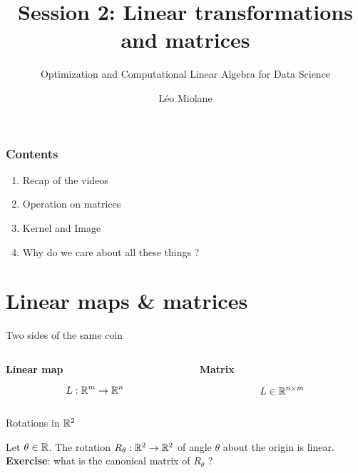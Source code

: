 \documentclass{beamer}
\title{Session 2: Linear transformations and matrices}
\subtitle{Optimization and Computational Linear Algebra for Data Science}
\author{Léo Miolane}
\date{}
\begin{document}
\setcounter{showProgressBar}{0}
\setcounter{showSlideNumbers}{0}

\frame{\titlepage}

\begin{frame}
	\frametitle{Contents}
	\begin{enumerate}
		\item Recap of the videos
		\item Operation on matrices
		\item Kernel and Image
		\item Why do we care about all these things ? 
	\end{enumerate}
\end{frame}


\setcounter{framenumber}{0}
\setcounter{showSlideNumbers}{1}

\section{Linear maps \& matrices}

\begin{frame}[t]{Two sides of the same coin}
	\grid
	\begin{columns}
		\hspace{-0.85cm}
		\begin{column}{0.5\textwidth}
			\vspace{-0.5cm}
			\begin{center}
				\bf Linear map
			\end{center}
			$$
			L: \mathbb{R}^m \to \mathbb{R}^n
			$$
			\vspace{6cm}
		\end{column}
		\vrule
		\begin{column}{0.5\textwidth}
			\vspace{-0.5cm}
			\begin{center}
				\bf Matrix
			\end{center}
			$$
			L \in \mathbb{R}^{n \times m}
			$$
			\vspace{6cm}
		\end{column}
	\end{columns}
	\pause
\end{frame}

\begin{frame}[t]{Rotations in $\mathbb{R}^2$}
	\grid

	\vspace{-0.25cm}
	Let $\theta \in \mathbb{R}$.
	The rotation $R_{\theta}: \mathbb{R}^2 \to \mathbb{R}^2$ of angle $\theta$ about the origin is linear.
	\\
	\textbf{Exercise}: what is the canonical matrix of $R_{\theta}$ ?
\end{frame}
\end{document}
